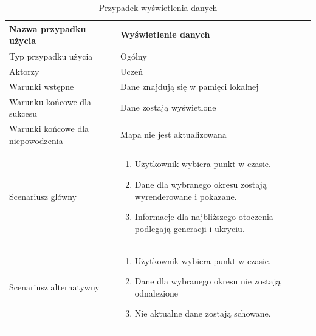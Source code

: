 \begin{table}[H]
    \centering
    \begin{tabular}{|l<{\raggedright}|p{3in}|}
    \hline
    Nazwa przypadku użycia & Wyświetlenie danych \\ \hline
    Typ przypadku użycia  & Ogólny  \\ \hline
    Aktorzy   & Uczeń     \\ \hline
    Warunki wstępne   & Dane znajdują się w pamięci lokalnej     \\ \hline
    Warunku końcowe dla sukcesu   & Dane zostają wyświetlone     \\ \hline
    Warunki końcowe dla niepowodzenia   & Mapa nie jest aktualizowana     \\ \hline
   Scenariusz glówny   &

    \begin{enumerate}
    \itemsep0em
        \item Użytkownik wybiera punkt w czasie.
        \item Dane dla wybranego okresu zostają wyrenderowane i pokazane.
        \item Informacje dla najbliższego otoczenia podlegają generacji i ukryciu.
    \end{enumerate}
     \\ \hline
    Scenariusz alternatywny   &

    \begin{enumerate}
    \itemsep0em
        \item Użytkownik wybiera punkt w czasie.
        \item Dane dla wybranego okresu nie zostają odnalezione
        \item Nie aktualne dane zostają schowane.
    \end{enumerate}
         \\ \hline
    \end{tabular}
    \caption{Przypadek wyświetlenia danych}
    \label{tab:caseuse2}
\end{table}

